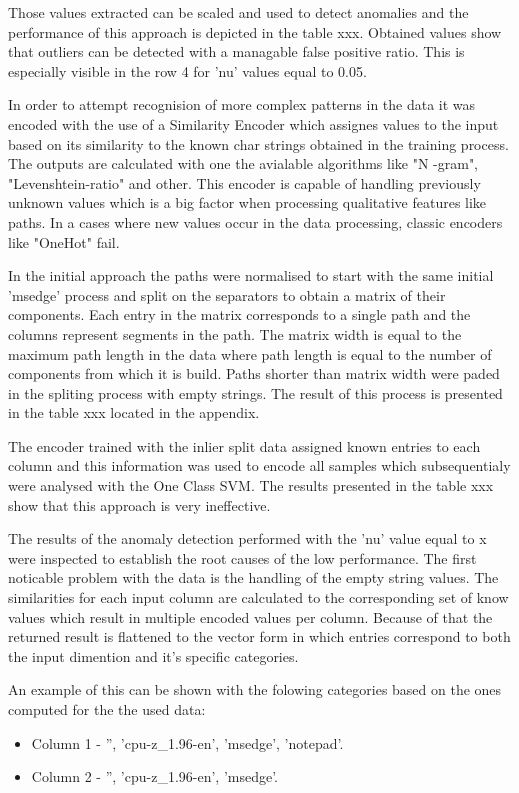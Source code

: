 \documentclass[a4paper,twoside,12pt]{book}
\begin{document}
Those values extracted can be scaled and used to detect anomalies and the performance
of this approach is depicted in the table xxx. Obtained values show that outliers can be
detected with a managable false positive ratio. This is especially visible in the row 
4 for 'nu' values equal to 0.05. 

In order to attempt recognision of more complex patterns in the data it was encoded with
the use of a Similarity Encoder which assignes values to the input based on its similarity 
to the known char strings obtained in the training process. The outputs are calculated with 
one the avialable algorithms like "N -gram", "Levenshtein-ratio" and other. This encoder is
capable of handling previously unknown values which is a big factor when processing 
qualitative features like paths. In a cases where new values occur in the data processing,
classic encoders like "OneHot" fail. 

In the initial approach the paths were normalised to start with the same initial 'msedge' 
process and split on the separators to obtain a matrix of their components. Each entry in the
matrix corresponds to a single path and the columns represent segments in the path. The matrix
width is equal to the maximum path length in the data where path length is equal to the number
of components from which it is build. Paths shorter than matrix width were paded in the spliting
process with empty strings. The result of this process is presented in the table xxx located in
the appendix. 

The encoder trained with the inlier split data assigned known entries to each column and this 
information was used to encode all samples which subsequentialy were analysed with the One Class
SVM. The results presented in the table xxx show that this approach is very ineffective. 

The results of the anomaly detection performed with the 'nu' value equal to x were inspected 
to establish the root causes of the low performance. The first noticable problem with the data
is the handling of the empty string values. The similarities for each input column are 
calculated to the corresponding set of know values which result in multiple encoded values per
column. Because of that the returned result is flattened to the vector form in which entries
correspond to both the input dimention and it's specific categories. 

An example of this can be shown with the folowing categories based on the ones computed 
for the the used data:
\begin{itemize}
	\item Column 1 - '', 'cpu-z\_1.96-en', 'msedge', 'notepad'.
	\item Column 2 - '', 'cpu-z\_1.96-en', 'msedge'.
\end{itemize}
\end{document}

